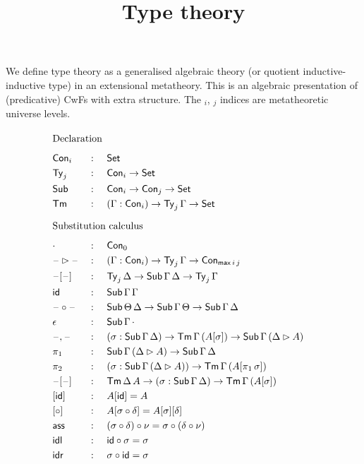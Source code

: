 \documentclass{article}
\begin{document}
\title{Type theory}
\maketitle

We define type theory as a generalised algebraic theory (or quotient
inductive-inductive type) in an extensional metatheory. This is an
algebraic presentation of (predicative) CwFs with extra structure. The
$_i$, $_j$ indices are metatheoretic universe levels.
\begin{alignat*}{5}
  & \heading{Declaration} \\
  & \Con_i && :\,\, && \Set \\
  & \Ty_j  && : && \Con_i\ra\Set \\
  & \Tms && : && \Con_i\ra\Con_j\ra\Set \\
  & \Tm  && : && (\Gamma:\Con_i)\ra\Ty_j\,\Gamma\ra\Set \\
  & \heading{Substitution calculus} \\
  & \cdot && : && \Con_0 \\
  & \blank\rhd\blank && : && (\Gamma:\Con_i)\ra\Ty_j\,\Gamma\ra\Con_{\max\,i\,j} \\
  & \blank[\blank] && : && \Ty_j\,\Delta\ra\Tms\,\Gamma\,\Delta\ra\Ty_j\,\Gamma \\
  & \id && : && \Tms\,\Gamma\,\Gamma \\
  & \blank\circ\blank && : && \Tms\,\Theta\,\Delta\ra\Tms\,\Gamma\,\Theta\ra\Tms\,\Gamma\,\Delta \\
  & \epsilon && : && \Tms\,\Gamma\,\cdot \\
  & \blank,\blank && : && (\sigma:\Tms\,\Gamma\,\Delta)\ra\Tm\,\Gamma\,(A[\sigma])\ra\Tms\,\Gamma\,(\Delta\rhd A) \\
  & \pi_1 && : && \Tms\,\Gamma\,(\Delta\rhd A) \ra \Tms\,\Gamma\,\Delta \\
  & \pi_2 && : && (\sigma:\Tms\,\Gamma\,(\Delta\rhd A))\ra\Tm\,\Gamma\,(A[\pi_1\,\sigma]) \\
  & \blank[\blank] && : && \Tm\,\Delta\,A\ra(\sigma:\Tms\,\Gamma\,\Delta)\ra\Tm\,\Gamma\,(A[\sigma]) \\
  & [\id] && : && A[\id] = A \\
  & [\circ] && : && A[\sigma \circ \delta] = A[\sigma][\delta] \\
  & \ass && : && (\sigma \circ \delta) \circ \nu = \sigma \circ (\delta \circ \nu) \\
  & \idl && : && \id\circ\sigma = \sigma \\
  & \idr && : && \sigma\circ\id = \sigma \\

\end{alignat*}
\end{document}
